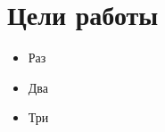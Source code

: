 





\section{Цели работы}

\begin{itemize}
	\setlength\itemsep{0em}
	\item Раз
	\item Два
	\item Три
\end{itemize}

